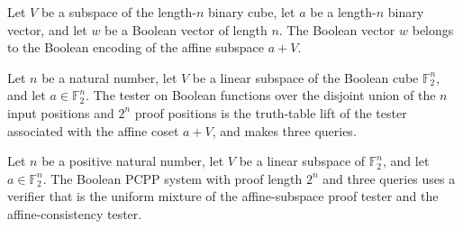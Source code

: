 \begin{definition}
\label{FABL.IsBoolAffineSubspace}
\leanok
{}
Let $V$ be a subspace of the length-$n$ binary cube, let $a$ be a length-$n$ binary
vector, and let $w$ be a Boolean vector of length $n$. The Boolean vector $w$ belongs to
the Boolean encoding of the affine subspace $a+V$.
\end{definition}

\begin{definition}
\label{FABL.affineSubspaceProofFunctionTester}
\leanok
{}
Let $n$ be a natural number, let $V$ be a linear subspace of the Boolean cube
$\mathbb{F}_2^n$, and let $a\in\mathbb{F}_2^n$. The tester on Boolean functions over
the disjoint union of the $n$ input positions and $2^n$ proof positions is the
truth-table lift of the tester associated with the affine coset $a+V$, and makes three
queries.
\end{definition}

\begin{definition}
\label{FABL.affineSubspacePCPPSystem}
\leanok
{}
Let $n$ be a positive natural number, let $V$ be a linear subspace of $\mathbb{F}_2^n$,
and let $a\in\mathbb{F}_2^n$. The Boolean PCPP system with proof length $2^n$ and three
queries uses a verifier that is the uniform mixture of the affine-subspace proof tester
and the affine-consistency tester.
\end{definition}

